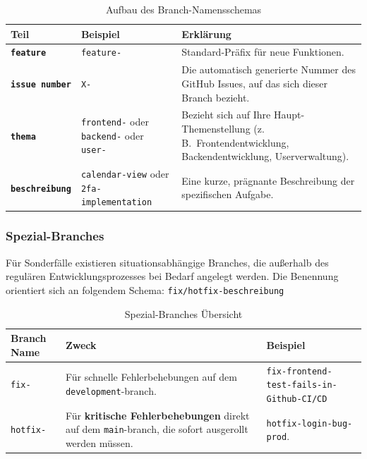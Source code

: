 \begin{table}[h]
\centering
\begin{tabular}{|p{}|p{}|p{}|}
\hline
\textbf{Teil} & \textbf{Beispiel} & \textbf{Erklärung} \\
\hline
\texttt{\textbf{feature}} &
\texttt{feature-} &
Standard-Präfix für neue Funktionen. \\
\hline
\texttt{\textbf{issue number}} &
\texttt{X-} &
Die automatisch generierte Nummer des GitHub Issues, auf das sich dieser Branch bezieht. \\
\hline
\texttt{\textbf{thema}} &
\texttt{frontend-} oder \texttt{backend-} oder \texttt{user-} &
Bezieht sich auf Ihre Haupt-Themenstellung (z.\,B.\ Frontendentwicklung, Backendentwicklung, Userverwaltung). \\
\hline
\texttt{\textbf{beschreibung}} &
\texttt{calendar-view} oder \texttt{2fa-implementation} &
Eine kurze, prägnante Beschreibung der spezifischen Aufgabe.\\
\hline
\end{tabular}
\caption{Aufbau des Branch-Namensschemas}
\label{tab:branch-schema}
\end{table}
\subsubsection{Spezial-Branches}
Für Sonderfälle existieren situationsabhängige Branches, die außerhalb des 
regulären Entwicklungsprozesses bei Bedarf angelegt werden.\newline
Die Benennung orientiert sich an folgendem Schema:
\texttt{fix/hotfix-\textlangle beschreibung\textrangle}
\begin{table}[h]
\centering
\small
\begin{tabular}{|p{}|p{}|p{}|}
\hline
\textbf{Branch Name} & \textbf{Zweck} & \textbf{Beispiel} \\
\hline
\texttt{fix-} &
Für schnelle Fehlerbehebungen auf dem \texttt{development}-branch. &
\texttt{fix-frontend-test-fails-in-} \texttt{Github-CI/CD} \\
\hline
\texttt{hotfix-} &
Für \textbf{kritische Fehlerbehebungen} direkt auf dem \texttt{main}-branch,
die sofort ausgerollt werden müssen. &
\texttt{hotfix-login-bug-prod}. \\
\hline
\end{tabular}
\caption{Spezial-Branches Übersicht}
\label{tab:spezial-branches}
\end{table}
